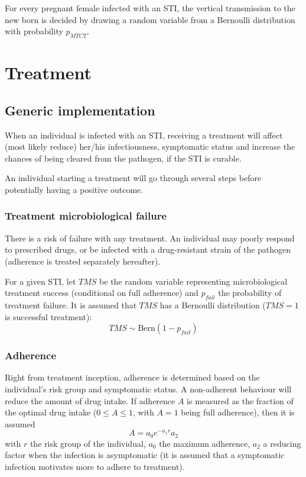 \documentclass[11pt, onecolumn]{article}
\begin{document}
For every pregnant female infected with an STI, the vertical transmission to the new born is decided by drawing a random variable from a Bernoulli distribution with probability $p_{MTCT}$.
 

\section{Treatment}


\subsection{Generic implementation}

When an individual is infected with an STI, receiving a treatment will affect (most likely reduce) her/his infectiousness, symptomatic status and increase the chances of being cleared from the pathogen, if the STI is curable.

An individual starting a treatment will go through several steps before potentially having a positive outcome. 

\subsubsection{Treatment microbiological failure}

There is a risk of failure with any treatment. An individual may poorly respond to prescribed drugs, or be infected with a drug-resistant strain of the pathogen (adherence is treated separately hereafter).

For a given STI, let $TMS$ be the random variable representing microbiological treatment success (conditional on full adherence) and $p_{fail}$ the probability of treatment failure. It is assumed that $TMS$ has a Bernoulli distribution ($TMS=1$ is successful treatment):
$$TMS \sim \mathrm{Bern}(1- p_{fail})$$


\subsubsection{Adherence}

Right from treatment inception, adherence is determined based on the individual's risk group and symptomatic status. A non-adherent behaviour will reduce the amount of drug intake. If adherence $A$ is measured as the fraction of the optimal drug intake ($0 \leq A\leq 1$, with $A=1$ being full adherence), then it is assumed
$$ A = a_0 e^{-a_1 r} a_2$$
with $r$ the risk group of the individual, $a_0$ the maximum adherence, $a_2$ a reducing factor when the infection is asymptomatic (it is assumed that a symptomatic infection motivates more to adhere to treatment).
\end{document}
